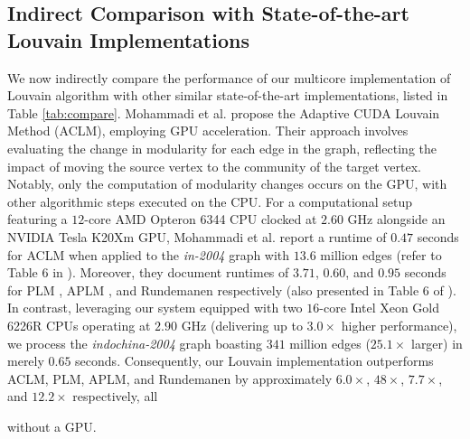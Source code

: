 \subsection{Indirect Comparison with State-of-the-art Louvain Implementations}
\label{sec:comparison-indirect}

We now indirectly compare the performance of our multicore implementation of Louvain algorithm with other similar state-of-the-art implementations, listed in Table \ref{tab:compare}. Mohammadi et al. \cite{com-mohammadi20} propose the Adaptive CUDA Louvain Method (ACLM), employing GPU acceleration. Their approach involves evaluating the change in modularity for each edge in the graph, reflecting the impact of moving the source vertex to the community of the target vertex. Notably, only the computation of modularity changes occurs on the GPU, with other algorithmic steps executed on the CPU. For a computational setup featuring a $12$-core AMD Opteron 6344 CPU clocked at $2.60$ GHz alongside an NVIDIA Tesla K20Xm GPU, Mohammadi et al. report a runtime of $0.47$ seconds for ACLM when applied to the \textit{in-2004} graph with $13.6$ million edges (refer to Table 6 in \cite{com-mohammadi20}). Moreover, they document runtimes of $3.71$, $0.60$, and $0.95$ seconds for PLM \cite{staudt2015engineering}, APLM \cite{com-fazlali17}, and Rundemanen \cite{com-naim17} respectively (also presented in Table 6 of \cite{com-mohammadi20}). In contrast, leveraging our system equipped with two $16$-core Intel Xeon Gold 6226R CPUs operating at $2.90$ GHz (delivering up to $3.0\times$ higher performance), we process the \textit{indochina-2004} graph boasting $341$ million edges ($25.1\times$ larger) in merely $0.65$ seconds. Consequently, our Louvain implementation outperforms ACLM, PLM, APLM, and Rundemanen by approximately $6.0\times$, $48\times$, $7.7\times$, and $12.2\times$ respectively, all without a GPU.

